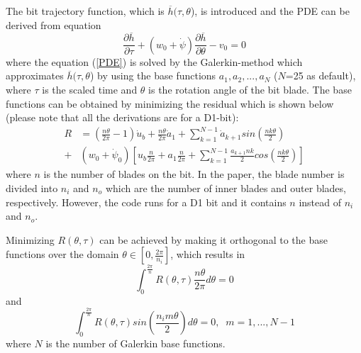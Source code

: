 The bit trajectory function, which is $\overline{h}(\tau, \theta$), is introduced and the PDE can be derived from equation
\begin{equation}\label{PDE}
\frac{\partial \overline{h}}{\partial \tau} + (w_0 + \dot{\psi})\frac{\partial \overline{h}}{\partial \theta}-v_0 = 0
\end{equation}
where the equation (\ref{PDE}) is solved by the Galerkin-method which approximates $\overline{h}(\tau, \theta$) by using the base functions $a_1, a_2, ..., a_N$ ($N$=25 as default), where $\tau$ is the scaled time and $\theta$ is the rotation angle of the bit blade. The base functions can be obtained by minimizing the residual which is shown below (please note that all the derivations are for a D1-bit):
\begin{equation}\label{GM}
\begin{split}
R &= \left(\frac{n \theta}{2 \pi}-1\right)\dot{u}_b + \frac{n \theta}{2 \pi}\dot{a}_1 + \sum_{k=1}^{N-1}\dot{a}_{k+1}sin\left(\frac{nk\theta}{2}\right) \\ + &(w_0 + \dot{\psi}_0)\left[u_b\frac{n}{2\pi}+a_1\frac{n}{2\pi} + \sum_{k=1}^{N-1}\frac{a_{k+1}nk}{2}cos\left(\frac{nk\theta}{2}\right)\right]
\end{split}
\end{equation}
where $n$ is the number of blades on the bit. In the paper, the blade number is divided into $n_i$ and $n_o$ which are the number of inner blades and outer blades, respectively. However, the code runs for a D1 bit and it contains $n$ instead of $n_i$ and $n_o$.

Minimizing $R(\theta, \tau)$ can be achieved by making it orthogonal to the base functions over the domain $\theta \in \left[0, \frac{2\pi}{n_i}\right]$, which results in
\begin{equation}\label{GM1}
 \int_{0}^{\frac{2\pi}{n}}R(\theta,\tau)\frac{n\theta}{2\pi}d\theta = 0
\end{equation}
and
\begin{equation}\label{GM2}
 \int_{0}^{\frac{2\pi}{n}}R(\theta, \tau)sin\left(\frac{n_im\theta}{2}\right)d\theta=0, \;\; m= 1,...,N-1
\end{equation}
where $N$ is the number of Galerkin base functions.

